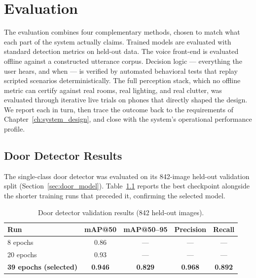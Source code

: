\chapter{Evaluation}
\label{ch:evaluation}

The evaluation combines four complementary methods, chosen to match what each part
of the system actually claims. Trained models are evaluated with standard detection
metrics on held-out data. The voice front-end is evaluated offline against a
constructed utterance corpus. Decision logic --- everything the user hears, and
when --- is verified by automated behavioral tests that replay scripted scenarios
deterministically. The full perception stack, which no offline metric can certify
against real rooms, real lighting, and real clutter, was evaluated through
iterative live trials on phones that directly shaped the design. We report each in
turn, then trace the outcome back to the requirements of
Chapter~\ref{ch:system_design}, and close with the system's operational
performance profile.

\section{Door Detector Results}
\label{sec:door_eval}

The single-class door detector was evaluated on its 842-image held-out validation
split (Section~\ref{sec:door_model}). Table~\ref{tab:door_results} reports the best
checkpoint alongside the shorter training runs that preceded it, confirming the
selected model.

\begin{table}[!htbp]
\centering
\caption[Door detector validation results]{Door detector validation results (842 held-out images).}
\label{tab:door_results}
\small
\begin{tabular}{lcccc}
\toprule
\textbf{Run} & \textbf{mAP@50} & \textbf{mAP@50--95} & \textbf{Precision} & \textbf{Recall} \\
\midrule
8 epochs   & 0.86 & --- & --- & --- \\
20 epochs  & 0.93 & --- & --- & --- \\
\textbf{39 epochs (selected)} & \textbf{0.946} & \textbf{0.829} & \textbf{0.968} & \textbf{0.892} \\
\bottomrule
\end{tabular}
\end{table}


